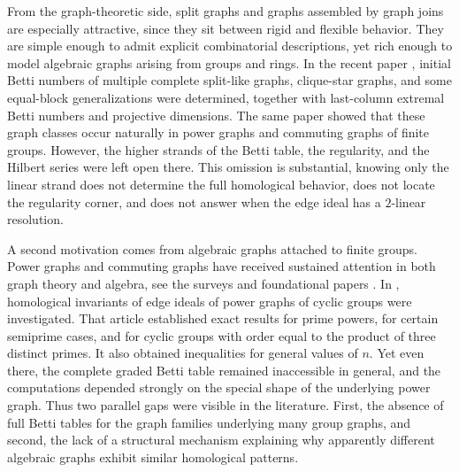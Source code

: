 \documentclass[12pt]{article}
\theoremstyle{definition}
\theoremstyle{remark}
\begin{document}
	From the graph-theoretic side, split graphs and graphs assembled by graph joins are especially attractive, since they sit between rigid and flexible behavior. They are simple enough to admit explicit combinatorial descriptions, yet rich enough to model algebraic graphs arising from groups and rings. In the recent paper \cite{Rather2024}, initial Betti numbers of multiple complete split-like graphs, clique-star graphs, and some equal-block generalizations were determined, together with last-column extremal Betti numbers and projective dimensions. The same paper showed that these graph classes occur naturally in power graphs and commuting graphs of finite groups. However, the higher strands of the Betti table, the regularity, and the Hilbert series were left open there. This omission is substantial, knowing only the linear strand does not determine the full homological behavior, does not locate the regularity corner, and does not answer when the edge ideal has a $2$-linear resolution.
	
	A second motivation comes from algebraic graphs attached to finite groups. Power graphs and commuting graphs have received sustained attention in both graph theory and algebra, see the surveys and foundational papers \cite{AbawajyKelarevChowdhury2013,ChakrabartyGhoshSen2009,KelarevQuinn2002,KumarSelvaganeshCameronChelvam2021}. In \cite{RatherWang2026}, homological invariants of edge ideals of power graphs of cyclic groups were investigated. That article established exact results for prime powers, for certain semiprime cases, and for cyclic groups with order equal to the product of three distinct primes. It also obtained inequalities for general values of $n$. Yet even there, the complete graded Betti table remained inaccessible in general, and the computations depended strongly on the special shape of the underlying power graph. Thus two parallel gaps were visible in the literature. First, the absence of full Betti tables for the graph families underlying many group graphs, and second, the lack of a structural mechanism explaining why apparently different algebraic graphs exhibit similar homological patterns.
	
\end{document}
